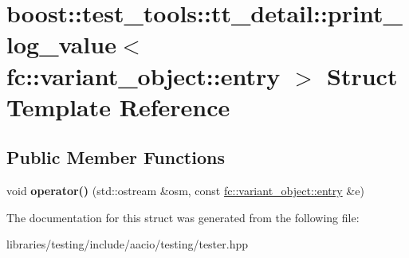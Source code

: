 \hypertarget{structboost_1_1test__tools_1_1tt__detail_1_1print__log__value_3_01fc_1_1variant__object_1_1entry_01_4}{}\section{boost\+:\+:test\+\_\+tools\+:\+:tt\+\_\+detail\+:\+:print\+\_\+log\+\_\+value$<$ fc\+:\+:variant\+\_\+object\+:\+:entry $>$ Struct Template Reference}
\label{structboost_1_1test__tools_1_1tt__detail_1_1print__log__value_3_01fc_1_1variant__object_1_1entry_01_4}
\subsection*{Public Member Functions}
\begin{DoxyCompactItemize}
\item 
\mbox{\label{structboost_1_1test__tools_1_1tt__detail_1_1print__log__value_3_01fc_1_1variant__object_1_1entry_01_4_add1f3499f1fc7885735f20284257ce6e}} 
void {\bfseries operator()} (std\+::ostream \&osm, const \mbox{\hyperlink{classfc_1_1variant__object_1_1entry}{fc\+::variant\+\_\+object\+::entry}} \&e)
\end{DoxyCompactItemize}


The documentation for this struct was generated from the following file\+:\begin{DoxyCompactItemize}
\item 
libraries/testing/include/aacio/testing/tester.\+hpp\end{DoxyCompactItemize}
